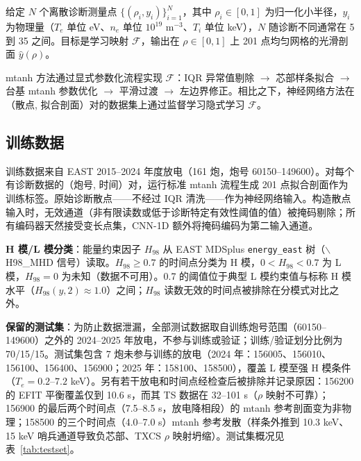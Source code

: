 \documentclass[a4paper,12pt]{ctexart}
\begin{document}
给定 $N$ 个离散诊断测量点 $\{(\rho_i, y_i)\}_{i=1}^N$，其中 $\rho_i \in [0, 1]$ 为归一化小半径，$y_i$ 为物理量（$T_e$ 单位 eV、$n_e$ 单位 $10^{19}$ m$^{-3}$、$T_i$ 单位 keV），$N$ 随诊断不同通常在 5 到 35 之间。目标是学习映射 $\mathcal{F}$，输出在 $\rho \in [0, 1]$ 上 201 点均匀网格的光滑剖面 $\hat{y}(\rho)$。

mtanh 方法通过显式参数化流程实现 $\mathcal{F}$：IQR 异常值剔除 $\to$ 芯部样条拟合 $\to$ 台基 mtanh 参数优化 $\to$ 平滑过渡 $\to$ 左边界修正。相比之下，神经网络方法在（散点, 拟合剖面）对的数据集上通过监督学习隐式学习 $\mathcal{F}$。

\subsection{训练数据}

训练数据来自 EAST 2015--2024 年度放电（161 炮，炮号 60150--149600）。对每个有诊断数据的（炮号, 时间）对，运行标准 mtanh 流程生成 201 点拟合剖面作为训练标签。原始诊断散点——不经过 IQR 清洗——作为神经网络输入。构造散点输入时，无效通道（非有限读数或低于诊断特定有效性阈值的值）被掩码剔除；所有编码器天然接受变长点集，CNN-1D 额外将掩码编码为第二输入通道。

\textbf{H 模/L 模分类}：能量约束因子 $H_{98}$ 从 EAST MDSplus \texttt{energy\_east} 树（$\backslash$H98\_MHD 信号）读取。$H_{98} \geq 0.7$ 的时间点分类为 H 模，$0 < H_{98} < 0.7$ 为 L 模，$H_{98} = 0$ 为未知（数据不可用）。0.7 的阈值位于典型 L 模约束值与标称 H 模水平（$H_{98}(y,2) \approx 1.0$）之间；$H_{98}$ 读数无效的时间点被排除在分模式对比之外。

\textbf{保留的测试集}：为防止数据泄漏，全部测试数据取自训练炮号范围（60150--149600）之外的 2024--2025 年放电，不参与训练或验证；训练/验证划分比例为 70/15/15。测试集包含 7 炮未参与训练的放电（2024 年：156005、156010、156100、156400、156900；2025 年：158100、158500），覆盖 L 模至强 H 模条件（$T_e = 0.2$--$7.2$ keV）。另有若干放电和时间点经检查后被排除并记录原因：156200 的 EFIT 平衡覆盖仅到 10.6 s，而其 TS 数据在 32--101 s（$\rho$ 映射不可靠）；156900 的最后两个时间点（7.5--8.5 s，放电降相段）的 mtanh 参考剖面变为非物理；158500 的三个时间点（4.0--7.0 s）mtanh 参考发散（样条外推到 10.3 keV、15 keV 哨兵通道导致负芯部、TXCS $\rho$ 映射坍缩）。测试集概况见表~\ref{tab:testset}。
\end{document}
